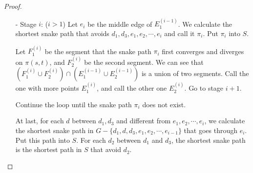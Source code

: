 \documentclass[11pt]{article}
\theoremstyle{plain}
\theoremstyle{definition}
\begin{document}
\begin{proof}
\begin{itemize}
\begin{center}
     \end{center}
    
    \item[-] Stage $i$: ($i> 1$) Let $e_i$ be the middle edge of $E_1^{(i-1)}$. We calculate the shortest snake path that avoids $d_1,d_3,e_1,e_2,\cdots,e_i$ and call it $\pi_i.$ Put $\pi_i$ into $S.$
    
    Let $F_1^{(i)}$ be the segment that the snake path $\pi_i$ first converges and diverges on $\pi(s,t)$, and $F_2^{(i)}$ be the second segment. We can see that $(F_1^{(i)}\cup F_2^{(i)})\cap(E_1^{(i-1)}\cup E_2^{(i-1)})$ is a union of two segments. Call the one with more points $E_1^{(i)}$, and call the other one $E_2^{(i)}.$ Go to stage $i+1$.
    
    Continue the loop until the snake path $\pi_i$ does not exist. 
    
    At last, for each $d$ between $d_1,d_3$ and different from $e_1,e_2,\cdots,e_i$, we calculate the shortest snake path in $G-\{d_1,d,d_3,e_1,e_2,\cdots,e_{i-1}\}$ that goes through $e_i.$ Put this path into $S.$ For each $d_2$ between $d_1$ and $d_3$, the shortest snake path is the shortest path in $S$ that avoid $d_2.$
    
    \begin{center}
        


\begin{tikzpicture}[x=0.75pt,y=0.75pt,yscale=-1,xscale=1]



\end{tikzpicture}
\end{center}
\end{itemize}
\end{proof}
\end{document}
